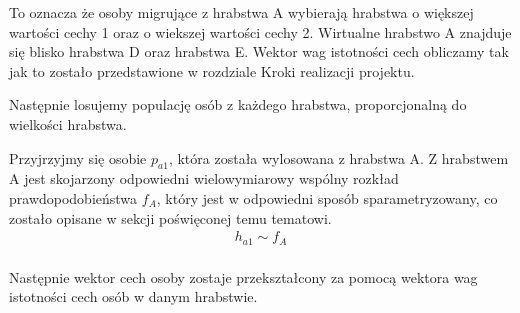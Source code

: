 \documentclass[a4paper,12pt]{article}
\begin{document}
\begin{center}
\end{center}

To oznacza że osoby migrujące z hrabstwa A wybierają hrabstwa o większej wartości cechy 1 oraz o wiekszej wartości cechy 2. Wirtualne hrabstwo A znajduje się blisko hrabstwa D oraz hrabstwa E. 
Wektor wag istotności cech obliczamy tak jak to zostało przedstawione w rozdziale Kroki realizacji projektu. 

Następnie losujemy populację osób z każdego hrabstwa, proporcjonalną do wielkości hrabstwa. 

Przyjrzyjmy się osobie $p_{a1}$, która została wylosowana z hrabstwa A. Z hrabstwem A jest skojarzony odpowiedni wielowymiarowy wspólny rozkład prawdopodobieństwa $f_A$, który jest w odpowiedni sposób sparametryzowany, co zostało opisane w sekcji poświęconej temu tematowi.
\begin{equation}
    \begin{gathered}
        h_{a1} \sim f_A \\
    \end{gathered}
\end{equation}

Następnie wektor cech osoby zostaje przekształcony za pomocą wektora wag istotności cech osób w danym hrabstwie. 
\end{document}
